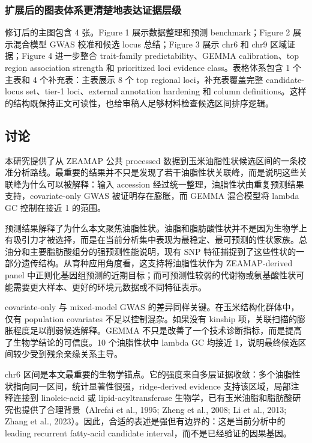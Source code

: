 \documentclass[
]{article}
\begin{document}
\subsubsection{扩展后的图表体系更清楚地表达证据层级}\label{ux6269ux5c55ux540eux7684ux56feux8868ux4f53ux7cfbux66f4ux6e05ux695aux5730ux8868ux8fbeux8bc1ux636eux5c42ux7ea7}

修订后的主图包含 4 张。Figure 1 展示数据整理和预测 benchmark；Figure 2
展示混合模型 GWAS 校准和候选 locus 总结；Figure 3 展示 chr6 和 chr9
区域证据；Figure 4 进一步整合 trait-family predictability、GEMMA
calibration、top region association strength 和 prioritized loci
evidence class。表格体系包含 1 个主表和 4 个补充表：主表展示 8 个 top
regional loci，补充表覆盖完整 candidate-locus set、tier-1 loci、external
annotation hardening 和 column
definitions。这样的结构既保持正文可读性，也给审稿人足够材料检查候选区间排序逻辑。

\subsection{讨论}\label{ux8ba8ux8bba}

本研究提供了从 ZEAMAP 公共 processed
数据到玉米油脂性状候选区间的一条校准分析路线。最重要的结果并不只是发现了若干油脂性状关联峰，而是说明这些关联峰为什么可以被解释：输入
accession 经过统一整理，油脂性状由重复预测结果支持，covariate-only GWAS
被证明存在膨胀，而 GEMMA 混合模型将 lambda GC 控制在接近 1 的范围。

预测结果解释了为什么本文聚焦油脂性状。油脂和脂肪酸性状并不是因为生物学上有吸引力才被选择，而是在当前分析集中表现为最稳定、最可预测的性状家族。总油分和主要脂肪酸组分的强预测性能说明，现有
SNP
特征捕捉到了这些性状的一部分遗传结构。从育种应用角度看，这支持将油脂性状作为
ZEAMAP-derived panel
中正则化基因组预测的近期目标；而可预测性较弱的代谢物或氨基酸性状可能需要更大样本、更好的环境元数据或不同特征表示。

covariate-only 与 mixed-model GWAS
的差异同样关键。在玉米结构化群体中，仅有 population covariates
不足以控制混杂。如果没有 kinship
项，关联扫描的膨胀程度足以削弱候选解释。GEMMA
不只是改善了一个技术诊断指标，而是提高了生物学结论的可信度。10
个油脂性状中 lambda GC 均接近
1，说明最终候选区间较少受到残余亲缘关系主导。

chr6
区间是本文最重要的生物学锚点。它的强度来自多层证据收敛：多个油脂性状指向同一区间，统计显著性很强，ridge-derived
evidence 支持该区域，局部注释连接到 linoleic-acid 或
lipid-acyltransferase
生物学，已有玉米油脂和脂肪酸研究也提供了合理背景（Alrefai et al., 1995;
Zheng et al., 2008; Li et al., 2013; Zhang et al.,
2023）。因此，合适的表述是强但有边界的：这是当前分析中的 leading
recurrent fatty-acid candidate interval，而不是已经验证的因果基因。
\end{document}
